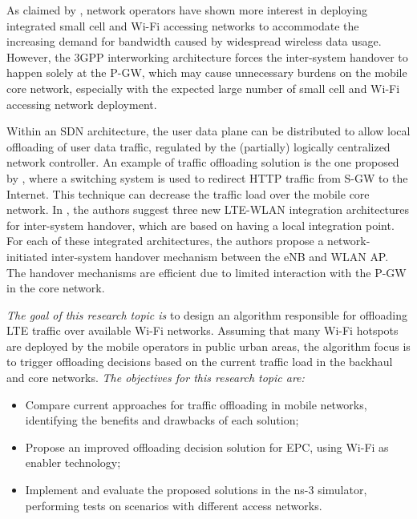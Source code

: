 As claimed by \citet{Tomici2015}, network operators have shown more interest in
deploying integrated small cell and Wi-Fi accessing networks to accommodate the
increasing demand for bandwidth caused by widespread wireless data usage.
However, the 3GPP interworking architecture forces the inter-system handover to
happen solely at the \ac{P-GW}, which may cause unnecessary burdens on the
mobile core network, especially with the expected large number of small cell
and Wi-Fi accessing network deployment.

Within an \ac{SDN} architecture, the user data plane can be distributed to
allow local offloading of user data traffic, regulated by the (partially)
logically centralized network controller. An example of traffic offloading
solution is the one proposed by \citet{Ghazisaeedi2013}, where a switching
system is used to redirect \ac{HTTP} traffic from \ac{S-GW} to the Internet.
This technique can decrease the traffic load over the mobile core network. In
\citet{Tomici2015}, the authors suggest three new \ac{LTE}-\ac{WLAN}
integration architectures for inter-system handover, which are based on having
a local integration point. For each of these integrated architectures, the
authors propose a network-initiated inter-system handover mechanism between the
\ac{eNB} and \ac{WLAN} \ac{AP}. The handover mechanisms are efficient due to
limited interaction with the \ac{P-GW} in the core network.

\emph{The goal of this research topic is} to design an algorithm responsible
for offloading \ac{LTE} traffic over available Wi-Fi networks. Assuming that
many Wi-Fi hotspots are deployed by the mobile operators in public urban areas,
the algorithm focus is to trigger offloading decisions based on the current
traffic load in the backhaul and core networks.
\emph{The objectives for this research topic are:}
\begin{itemize}
  \item Compare current approaches for traffic offloading in mobile networks,
  identifying the benefits and drawbacks of each solution;

  \item Propose an improved offloading decision solution for \ac{EPC}, using
  Wi-Fi as enabler technology;

  \item Implement and evaluate the proposed solutions in the \ac{ns-3}
  simulator, performing tests on scenarios with different access networks.
\end{itemize}

